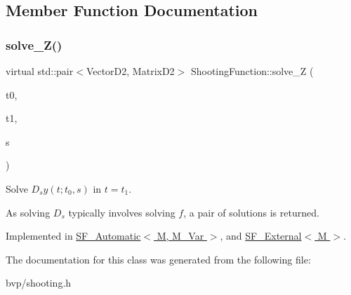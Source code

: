 \subsection{Member Function Documentation}
\mbox{\label{classShootingFunction_a41360056996ee70c43c4538acd6e28d8}} 
\subsubsection{\texorpdfstring{solve\+\_\+\+Z()}{solve\_Z()}}
{\footnotesize\ttfamily virtual std\+::pair$<$Vector\+D2, Matrix\+D2$>$ Shooting\+Function\+::solve\+\_\+Z (\begin{DoxyParamCaption}\item[{F\+P\+\_\+\+Type}]{t0,  }\item[{F\+P\+\_\+\+Type}]{t1,  }\item[{const Vector\+D2 \&}]{s }\end{DoxyParamCaption})\hspace{0.3cm}{\ttfamily [pure virtual]}}



Solve $D_s y(t; t_0, s)$ in $t = t_1$. 

As solving $D_s$ typically involves solving $f$, a pair of solutions is returned. 

Implemented in \hyperlink{classSF__Automatic_a42df8fe14e093057d2fe40cb42a0460e}{S\+F\+\_\+\+Automatic$<$ M, M\+\_\+\+Var $>$}, and \hyperlink{classSF__External_a72c762001bc0a4bc43ac82aba45ad3ba}{S\+F\+\_\+\+External$<$ M $>$}.



The documentation for this class was generated from the following file\+:\begin{DoxyCompactItemize}
\item 
bvp/shooting.\+h\end{DoxyCompactItemize}
